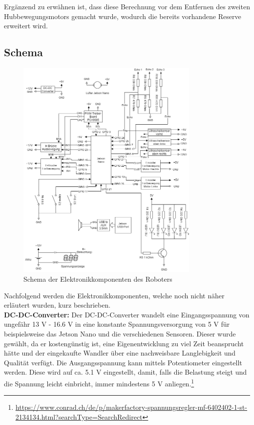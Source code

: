Ergänzend zu erwähnen ist, dass diese Berechnung vor dem Entfernen des zweiten Hubbewegungsmotors gemacht wurde, wodurch die bereits vorhandene Reserve erweitert wird.

\newpage

\newpage
\subsection{Schema}
\begin{figure}[h]
  \includegraphics[width=0.8\textwidth]{img/Elektronik/schema.png}
  \centering
  \caption{Schema der Elektronikkomponenten des Roboters}
  \label{fig:schema}
\end{figure}

\newpage

Nachfolgend werden die Elektronikkomponenten, welche noch nicht näher erläutert wurden, kurz beschrieben.\\

\textbf{DC-DC-Converter:} Der DC-DC-Converter wandelt eine Eingangsspannung von ungefähr 13 V - 16.6 V in eine konstante Spannungsversorgung von 5 V für beispielsweise das Jetson Nano und die verschiedenen Sensoren. Dieser wurde gewählt, da er kostengünstig ist, eine Eigenentwicklung zu viel Zeit beansprucht hätte und der eingekaufte Wandler über eine nachweisbare Langlebigkeit und Qualität verfügt. Die Ausgangsspannung kann mittels Potentiometer eingestellt werden. Diese wird auf ca. 5.1 V eingestellt, damit, falls die Belastung steigt und die Spannung leicht einbricht, immer mindestens 5 V anliegen.\footnote{\url{https://www.conrad.ch/de/p/makerfactory-spannungsregler-mf-6402402-1-st-2134134.html?searchType=SearchRedirect}}\\


